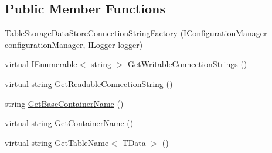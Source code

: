 \subsection*{Public Member Functions}
\begin{DoxyCompactItemize}
\item 
\hyperlink{classCqrs_1_1Azure_1_1BlobStorage_1_1DataStores_1_1TableStorageDataStoreConnectionStringFactory_a45eeda7a13a9c45b2b0f6e5c89ee0d25}{Table\+Storage\+Data\+Store\+Connection\+String\+Factory} (\hyperlink{interfaceCqrs_1_1Configuration_1_1IConfigurationManager}{I\+Configuration\+Manager} configuration\+Manager, I\+Logger logger)
\item 
virtual I\+Enumerable$<$ string $>$ \hyperlink{classCqrs_1_1Azure_1_1BlobStorage_1_1DataStores_1_1TableStorageDataStoreConnectionStringFactory_a65b6f404ac2434c6366af73a22e914d1}{Get\+Writable\+Connection\+Strings} ()
\item 
virtual string \hyperlink{classCqrs_1_1Azure_1_1BlobStorage_1_1DataStores_1_1TableStorageDataStoreConnectionStringFactory_a0bdcd6f6d273a225c3ebcd6aa9386b95}{Get\+Readable\+Connection\+String} ()
\item 
string \hyperlink{classCqrs_1_1Azure_1_1BlobStorage_1_1DataStores_1_1TableStorageDataStoreConnectionStringFactory_a03239d850e3fd95cd1507780425a7c94}{Get\+Base\+Container\+Name} ()
\item 
virtual string \hyperlink{classCqrs_1_1Azure_1_1BlobStorage_1_1DataStores_1_1TableStorageDataStoreConnectionStringFactory_aa1f5d2a17524e6438ad87e60cbaf6f23}{Get\+Container\+Name} ()
\item 
virtual string \hyperlink{classCqrs_1_1Azure_1_1BlobStorage_1_1DataStores_1_1TableStorageDataStoreConnectionStringFactory_ac992c8d5387ddf5965cc661f1b85a721}{Get\+Table\+Name$<$ T\+Data $>$} ()
\end{DoxyCompactItemize}
